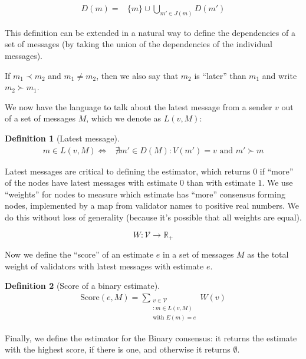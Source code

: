 \documentclass{article}
\theoremstyle{definition}
\newtheorem{defn}{Definition}[section]
\begin{document}
\begin{equation*}
\begin{split}
D(m) = &\{m\}\cup \bigcup_{m' \in J(m)} D(m')
\end{split}
\end{equation*}

This definition can be extended in a natural way to define the dependencies of a set of messages (by taking the union of the dependencies of the individual messages).

If $m_1 \prec m_2$ and $m_1 \neq m_2$, then we also say that $m_2$ is ``later'' than $m_1$ and write $m_2 \succ m_1$.

We now have the language to talk about the latest message from a sender $v$ out of a set of messages $M$, which we denote as $L(v, M)$:

\begin{defn}[Latest message]
\begin{equation*}
\begin{split}
m \in L(v, M) \iff & \nexists m' \in D(M) : V(m') = v \text{ and } m' \succ m
\end{split}
\end{equation*}
\end{defn}

Latest messages are critical to defining the estimator, which returns $0$ if ``more'' of the nodes have latest messages with estimate $0$ than with estimate $1$. We use ``weights'' for nodes to measure which estimate has ``more'' consensus forming nodes, implemented by a map from validator names to positive real numbers. We do this without loss of generality (because it's possible that all weights are equal).

$$
W:\mathcal{V} \to \mathbb{R}_+
$$


Now we define the ``score'' of an estimate $e$ in a set of messages $M$ as the total weight of validators with latest messages with estimate $e$.

\begin{defn}[Score of a binary estimate]
\begin{align}
\text{Score}(e, M) = \sum_{\substack{v \in \mathcal{V} \\ : m \in L(v,M) \\ \text{with } E(m) = e}} W(v)
\end{align}
\end{defn}

Finally, we define the estimator for the Binary consensus: it returns the estimate with the highest score, if there is one, and otherwise it returns $\emptyset$.
\end{document}
